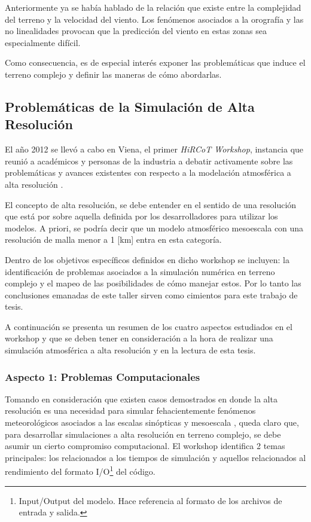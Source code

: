Anteriormente ya se había hablado de la relación que existe entre la complejidad del terreno y la velocidad del viento. Los fenómenos asociados a la orografía y las no linealidades provocan que la predicción del viento en estas zonas sea especialmente difícil. 

Como consecuencia, es de especial interés exponer las problemáticas que induce el terreno complejo y definir las maneras de cómo abordarlas.
\subsection{Problemáticas de la Simulación de Alta Resolución}
El año 2012 se llevó a cabo en Viena, el primer \emph{HiRCoT Workshop}, instancia que reunió a académicos y personas de la industria a debatir activamente sobre las problemáticas y avances existentes con respecto a la modelación atmosférica a alta resolución \citep{arnold2012high}.

El concepto de alta resolución, se debe entender en el sentido de una resolución que está por sobre aquella definida por los desarrolladores para utilizar los modelos. A priori, se podría decir que un modelo atmosférico mesoescala con una resolución de malla menor a 1 [km] entra en esta categoría.

Dentro de los objetivos específicos definidos en dicho workshop se incluyen: la identificación de problemas asociados a la simulación numérica en terreno complejo y el mapeo de las posibilidades de cómo manejar estos. Por lo tanto las conclusiones emanadas de este taller sirven como cimientos para este trabajo de tesis.

A continuación se presenta un resumen de los cuatro aspectos estudiados en el workshop y que se deben tener en consideración a la hora de realizar una simulación atmosférica a alta resolución y en la lectura de esta tesis.

\subsubsection{Aspecto 1: Problemas Computacionales}
Tomando en consideración que existen casos demostrados en donde la alta resolución es una necesidad para simular fehacientemente fenómenos meteorológicos asociados a las escalas sinópticas y mesoescala \citep{morton2007tradeoffs,stevens2010using}, queda claro que, para desarrollar simulaciones a alta resolución en terreno complejo, se debe asumir un cierto compromiso computacional. El workshop identifica 2 temas principales: los relacionados a los tiempos de simulación y aquellos relacionados al rendimiento del formato I/O\footnote{Input/Output del modelo. Hace referencia al formato de los archivos de entrada y salida.} del código.

